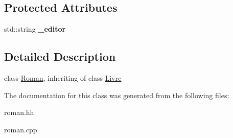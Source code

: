 \subsection*{Protected Attributes}
\begin{DoxyCompactItemize}
\item 
\hypertarget{classRoman_a8ebd12edeb299ea1dc6b7e1706ce03dc}{
std::string {\bfseries \_\-editor}}
\label{classRoman_a8ebd12edeb299ea1dc6b7e1706ce03dc}

\end{DoxyCompactItemize}


\subsection{Detailed Description}
class \hyperlink{classRoman}{Roman}, inheriting of class \hyperlink{classLivre}{Livre} 

The documentation for this class was generated from the following files:\begin{DoxyCompactItemize}
\item 
roman.hh\item 
roman.cpp\end{DoxyCompactItemize}
